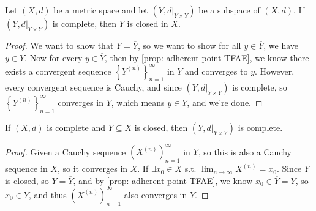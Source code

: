 \begin{proposition}
    Let \((X, d)\) be a metric space and let \(\left( Y, d\vert_{Y \times Y} \right) \) be a subspace of \((X, d)\). If \(\left( Y, d\vert_{Y \times Y} \right) \) is complete, then \(Y\) is closed in \(X\).
\end{proposition}
\begin{proof}
    We want to show that \(Y = \overline{Y} \), so we want to show for all \(y \in \overline{Y} \), we have \(y \in Y\). Now for every \(y \in \overline{Y} \), then by \autoref{prop: adherent point TFAE}, we know there exists a convergent sequence \(\left\{ Y^{(n)} \right\}_{n=1}^{\infty}  \) in \(Y\) and converges to \(y\). However, every convergent sequence is Cauchy, and since \((Y, d\vert_{Y \times Y})\) is complete, so \(\left\{ Y^{(n)} \right\}_{n=1}^{\infty}  \) converges in \(Y\), which means \(y \in Y\), and we're done.        
\end{proof}

\begin{proposition}
    If \((X, d)\) is complete and \(Y \subseteq X\) is closed, then \(\left( Y, d\vert_{Y \times Y} \right) \) is complete.   
\end{proposition}
\begin{proof}
    Given a Cauchy sequence \(\left( X^{(n)} \right)_{n=1}^{\infty}  \) in \(Y\), so this is also a Cauchy sequence in \(X\), so it converges in \(X\). If \(\exists x_0 \in X\) s.t. \(\lim_{n \to \infty} X^{(n)} = x_0 \). Since \(Y\) is closed, so \(Y = \overline{Y} \), and by \autoref{prop: adherent point TFAE}, we know \(x_0 \in \overline{Y} = Y \), so \(x_0 \in Y\), and thus \(\left( X^{(n)} \right)_{n=1}^{\infty }\) also converges in \(Y\).         
\end{proof}
